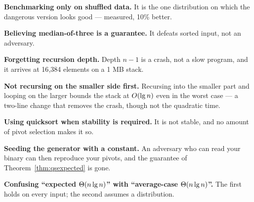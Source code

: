 \begin{pitfall}
\begin{tight}
  \item \textbf{Benchmarking only on shuffled data.} It is the one
        distribution on which the dangerous version looks good --- measured,
        10\% better.
  \item \textbf{Believing median-of-three is a guarantee.} It defeats sorted
        input, not an adversary.
  \item \textbf{Forgetting recursion depth.} Depth $n-1$ is a crash, not a slow
        program, and it arrives at 16{,}384 elements on a 1 MB stack.
  \item \textbf{Not recursing on the smaller side first.} Recursing into the
        smaller part and looping on the larger bounds the stack at
        $O(\operatorname{lg} n)$ even in the worst case --- a two-line change that
        removes the crash, though not the quadratic time.
  \item \textbf{Using quicksort when stability is required.} It is not stable,
        and no amount of pivot selection makes it so.
  \item \textbf{Seeding the generator with a constant.} An adversary who can
        read your binary can then reproduce your pivots, and the guarantee of
        Theorem~\ref{thm:qsexpected} is gone.
  \item \textbf{Confusing ``expected $\Theta(n\operatorname{lg} n)$'' with ``average-case
        $\Theta(n\operatorname{lg} n)$''.} The first holds on every input; the second assumes
        a distribution.
\end{tight}
\end{pitfall}

